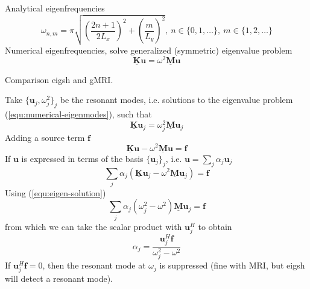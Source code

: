 \documentclass[11pt, a4paper]{article}
\begin{document}
Analytical eigenfrequencies
\begin{equation}
    \omega_{n, m} = \pi \sqrt{\left(\frac{2n + 1}{2L_x}\right)^2 + \left(\frac{m}{L_y}\right)^2},
    ~n \in \{0, 1, \dots\}, ~m \in \{1, 2, \dots \} \label{equ:analytical-eigenmodes}
\end{equation}
Numerical eigenfrequencies, solve generalized (symmetric) eigenvalue problem
\begin{equation}
    \mathbf{\underline{K}} \mathbf{u} = \omega^2 \mathbf{\underline{M}} \mathbf{u}
    \label{equ:numerical-eigenmodes}
\end{equation}
\begin{table}[ht]
    \caption{Comparison eigsh and gMRI.}
    \label{tab:rectangular_cavity_comparison}
    
\end{table}

Take $\{ \mathbf{u}_j, \omega_j^2 \}_j$ be the resonant modes, i.e. solutions to 
the eigenvalue problem (\ref{equ:numerical-eigenmodes}), such that
\begin{equation}
    \mathbf{\underline{K}} \mathbf{u}_j = \omega_j^2 \mathbf{\underline{M}} \mathbf{u}_j
    \label{equ:eigen-solution}
\end{equation}
Adding a source term $\mathbf{f}$ 
\begin{equation}
    \mathbf{\underline{K}} \mathbf{u} - \omega^2 \mathbf{\underline{M}} \mathbf{u} = \mathbf{f}
\end{equation}
If $\mathbf{u}$ is expressed in terms of the basis $\{ \mathbf{u}_j \}_j$, i.e.
$\mathbf{u} = \sum_j \alpha_j \mathbf{u}_j$
\begin{equation} 
    \sum_j \alpha_j (\mathbf{\underline{K}} \mathbf{u}_j - \omega^2 \mathbf{\underline{M}} \mathbf{u}_j) = \mathbf{f}
\end{equation}
Using (\ref{equ:eigen-solution})
\begin{equation}
    \sum_j \alpha_j (\omega_j^2 - \omega^2) \mathbf{\underline{M}} \mathbf{u}_j = \mathbf{f}
\end{equation}
from which we can take the scalar product with $\mathbf{u}_j^H$ to obtain
\begin{equation}
    \alpha_j = \frac{\mathbf{u}_j^H \mathbf{f}}{\omega_j^2 - \omega^2}
\end{equation}
If $\mathbf{u}_j^H \mathbf{f} = 0$, then the resonant mode at $\omega_j$ is 
suppressed (fine with MRI, but eigsh will detect a resonant mode).
\end{document}
